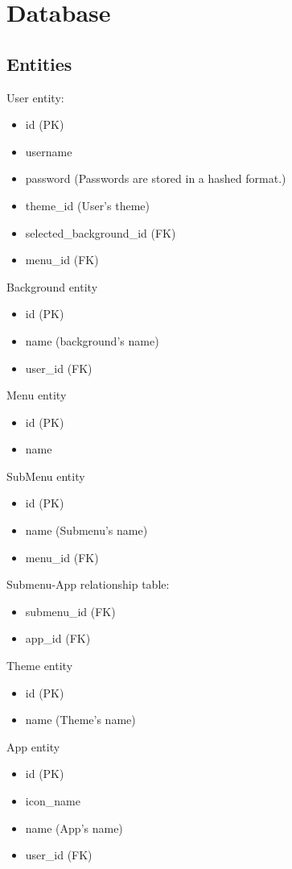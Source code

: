 \documentclass[12pt]{article}
\begin{document}
\section{Database}
\subsection{Entities}
User entity:
\begin{itemize}
	\item id (PK)
	\item username
	\item password (Passwords are stored in a hashed format.)
	\item theme_id (User's theme)
	\item selected_background_id (FK)
	\item menu_id (FK)
\end{itemize}
Background entity
\begin{itemize}
	\item id (PK)
	\item name (background's name)
	\item user_id (FK)
\end{itemize}
Menu entity
\begin{itemize}
	\item id (PK)
	\item name
\end{itemize}
SubMenu entity
\begin{itemize}
	\item id (PK)
	\item name (Submenu's name)
	\item menu_id (FK)
\end{itemize}
Submenu-App relationship table:
\begin{itemize}
	\item submenu_id (FK)
	\item app_id (FK)
\end{itemize}
Theme entity
\begin{itemize}
	\item id (PK)
	\item name (Theme's name)
\end{itemize}
App entity
\begin{itemize}
	\item id (PK)
	\item icon_name
	\item name (App's name)
	\item user_id (FK)
\end{itemize}
\end{document}
